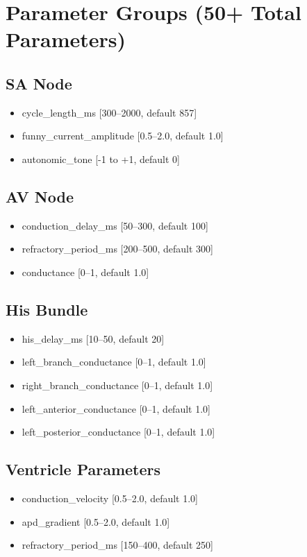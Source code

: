 \documentclass[12pt]{book}
\begin{document}
\section{Parameter Groups (50+ Total Parameters)}

\subsection{SA Node}
\begin{itemize}
  \item cycle\_length\_ms [300--2000, default 857]
  \item funny\_current\_amplitude [0.5--2.0, default 1.0]
  \item autonomic\_tone [-1 to +1, default 0]
\end{itemize}

\subsection{AV Node}
\begin{itemize}
  \item conduction\_delay\_ms [50--300, default 100]
  \item refractory\_period\_ms [200--500, default 300]
  \item conductance [0--1, default 1.0]
\end{itemize}

\subsection{His Bundle}
\begin{itemize}
  \item his\_delay\_ms [10--50, default 20]
  \item left\_branch\_conductance [0--1, default 1.0]
  \item right\_branch\_conductance [0--1, default 1.0]
  \item left\_anterior\_conductance [0--1, default 1.0]
  \item left\_posterior\_conductance [0--1, default 1.0]
\end{itemize}

\subsection{Ventricle Parameters}
\begin{itemize}
  \item conduction\_velocity [0.5--2.0, default 1.0]
  \item apd\_gradient [0.5--2.0, default 1.0]
  \item refractory\_period\_ms [150--400, default 250]
\end{itemize}
\end{document}
